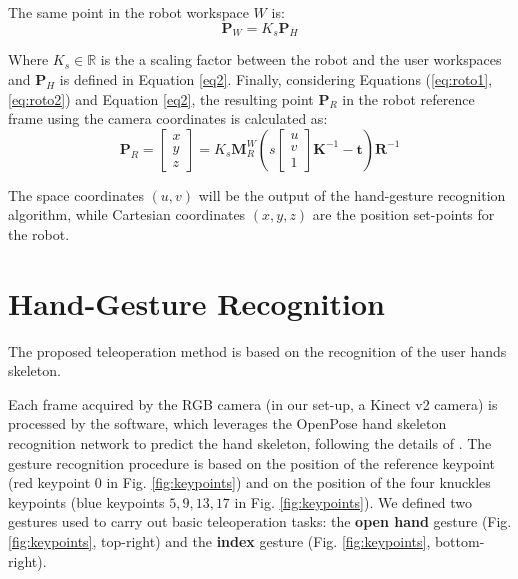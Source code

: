 \documentclass[a4paper, 10pt, conference]{ieeeconf}      %
\begin{document}
The same point in the robot workspace $W$ is:
\begin{equation}\label{eq:roto2}
\mathbf{P}_{W} = K_s\mathbf{P}_{H}
\end{equation}

Where $K_s\in \mathbb{R}$ is the a scaling factor between the robot and the user workspaces and $\mathbf{P}_{H}$ is defined in Equation \ref{eq2}. Finally, considering Equations (\ref{eq:roto1},\ref{eq:roto2}) and Equation \ref{eq2}, the resulting point $\mathbf{P}_R$ in the robot reference frame using the camera coordinates is calculated as:
\begin{equation}
\mathbf{P}_{R} = \begin{bmatrix}
x \\
y \\
z
\end{bmatrix}=
K_s\mathbf{M}^W_{R}
\left(s 
\begin{bmatrix}
u \\
v \\
1
\end{bmatrix}
\mathbf{K}^{-1}-\mathbf{t}\right)\mathbf{R}^{-1}
\end{equation}

The space coordinates $(u,v)$ will be the output of the hand-gesture recognition algorithm, while Cartesian coordinates $(x,y,z)$ are the position set-points for the robot.

\section{Hand-Gesture Recognition}\label{sec:HG_recon}
The proposed teleoperation method is based on the recognition of the user hands skeleton.

Each frame acquired by the RGB camera (in our set-up, a Kinect v2 camera) is processed by the software, which leverages the OpenPose hand skeleton recognition network to predict the hand skeleton, following the details of \cite{simon2017hand}.
The gesture recognition procedure is based on the position of the reference keypoint (red keypoint $0$ in Fig. \ref{fig:keypoints}) and on the position of the four knuckles keypoints (blue keypoints $5, 9, 13, 17$ in Fig. \ref{fig:keypoints}). We defined two gestures used to carry out basic teleoperation tasks: the \textbf{open hand} gesture (Fig. \ref{fig:keypoints}, top-right) and the \textbf{index} gesture (Fig. \ref{fig:keypoints}, bottom-right).
\end{document}
